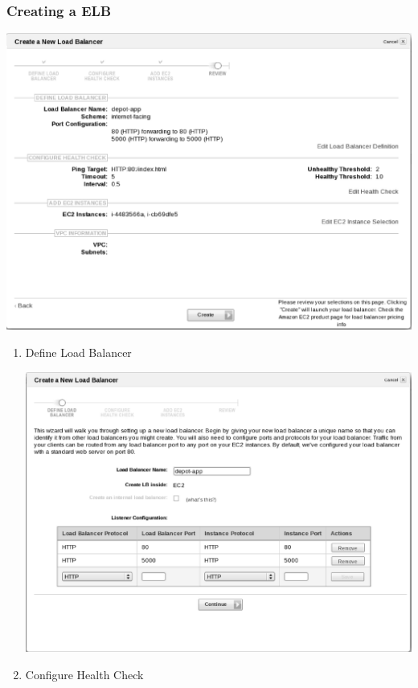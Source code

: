 \documentclass{beamer}
\begin{document}
\begin{frame}
\frametitle{Creating a ELB}
\begin{center}
\includegraphics[scale=0.2]{readytocreate.eps}
\framebreak
\end{center}
\begin{enumerate}	
\item Define Load Balancer
\begin{center}
\includegraphics[scale=0.2]{createaelb0.eps}
\end{center}
\item Configure Health Check
\begin{center}

\end{center}
\end{enumerate}
\end{frame}
\end{document}
